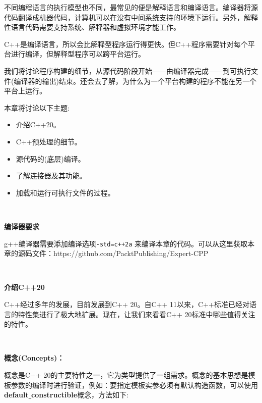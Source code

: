不同编程语言的执行模型也不同，最常见的便是解释语言和编译语言。编译器将源代码翻译成机器代码，计算机可以在没有中间系统支持的环境下运行。另外，解释性语言代码需要支持系统、解释器和虚拟环境才能工作。 \par
C++是编译语言，所以会比解释型程序运行得更快。但C++程序需要针对每个平台进行编译，但解释型程序可以跨平台运行。 \par
我们将讨论程序构建的细节，从源代码阶段开始——由编译器完成——到可执行文件(编译器的输出)结束。还会去了解，为什么为一个平台构建的程序不能在另一个平台上运行。 \par
本章将讨论以下主题: \par

\begin{itemize}
	\item 介绍C++20。
	\item C++预处理的细节。
	\item 源代码的(底层)编译。
	\item 了解连接器及其功能。
	\item 加载和运行可执行文件的过程。
\end{itemize}

\noindent\textbf{}\ \par
\textbf{编译器要求} \ \par
g++编译器需要添加编译选项\texttt{-std=c++2a} 来编译本章的代码。可以从这里获取本章的源码文件：https:/​/github.​com/PacktPublishing/Expert-CPP \par

\noindent\textbf{}\ \par
\textbf{介绍C++20} \ \par
C++经过多年的发展，目前发展到C++ 20。自C++ 11以来，C++标准已经对语言的特性集进行了极大地扩展。现在，让我们来看看C++ 20标准中哪些值得关注的特性。 \par

\noindent\textbf{}\ \par
\textbf{概念(Concepts)：}\ \par
概念是C++ 20的主要特性之一，它为类型提供了一组需求。概念的基本思想是模板参数的编译时进行验证，例如：要指定模板实参必须有默认构造函数，可以使用\textbf{default\underline{ }constructible}概念，方法如下: \par
\noindent\textbf{}\ \par

	
